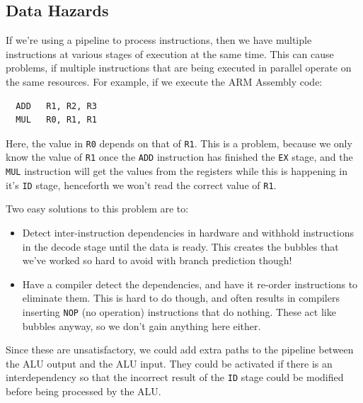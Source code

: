 \subsection{Data Hazards}

If we're using a pipeline to process instructions, then we have multiple
instructions at various stages of execution at the same time. This can cause
problems, if multiple instructions that are being executed in parallel operate
on the same resources. For example, if we execute the ARM Assembly code:

\begin{verbatim}
  ADD   R1, R2, R3
  MUL   R0, R1, R1
\end{verbatim}



Here, the value in \texttt{R0} depends on that of \texttt{R1}. This is a
problem, because we only know the value of \texttt{R1} once the \texttt{ADD}
instruction has finished the \texttt{EX} stage, and the \texttt{MUL} instruction
will get the values from the registers while this is happening in it's
\texttt{ID} stage, henceforth we won't read the correct value of \texttt{R1}.

Two easy solutions to this problem are to:

\begin{itemize}
  \item Detect inter-instruction dependencies in hardware and withhold
  instructions in the decode stage until the data is ready. This creates the
  bubbles that we've worked so hard to avoid with branch prediction though!

  \item Have a compiler detect the dependencies, and have it re-order
  instructions to eliminate them. This is hard to do though, and often results
  in compilers inserting \texttt{NOP} (no operation) instructions that do
  nothing. These act like bubbles anyway, so we don't gain anything here either.
\end{itemize}

Since these are unsatisfactory, we could add extra paths to the pipeline between
the ALU output and the ALU input. They could be activated if there is an
interdependency so that the incorrect result of the \texttt{ID} stage could be
modified before being processed by the ALU.

